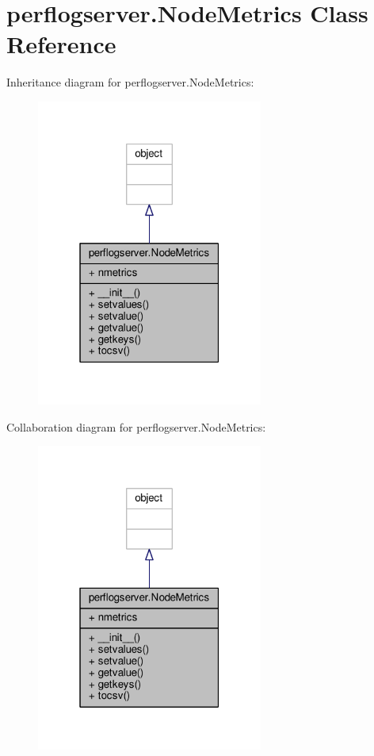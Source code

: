 \hypertarget{classperflogserver_1_1_node_metrics}{\section{perflogserver.\+Node\+Metrics Class Reference}
\label{classperflogserver_1_1_node_metrics}
}


Inheritance diagram for perflogserver.\+Node\+Metrics\+:
\nopagebreak
\begin{figure}[H]
\begin{center}
\leavevmode
\includegraphics[width=211pt]{classperflogserver_1_1_node_metrics__inherit__graph}
\end{center}
\end{figure}


Collaboration diagram for perflogserver.\+Node\+Metrics\+:
\nopagebreak
\begin{figure}[H]
\begin{center}
\leavevmode
\includegraphics[width=211pt]{classperflogserver_1_1_node_metrics__coll__graph}
\end{center}
\end{figure}
